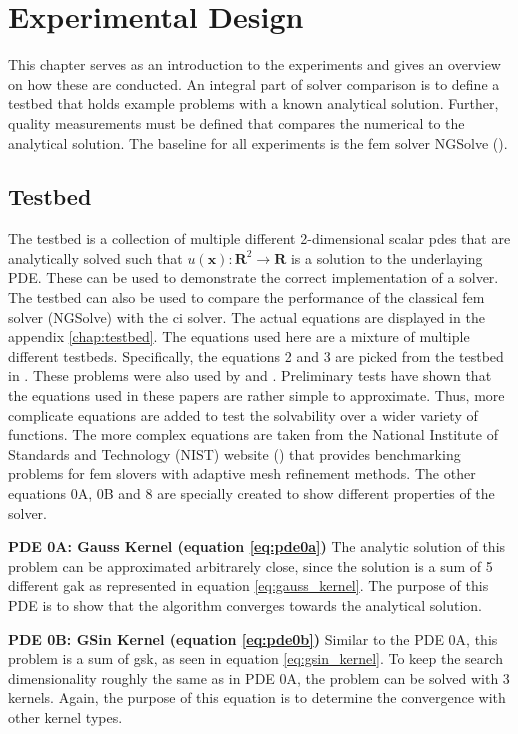 \documentclass[./\jobname.tex]{subfiles}
\begin{document}
\chapter{Experimental Design}
This chapter serves as an introduction to the experiments and gives an overview on how these are conducted. An integral part of solver comparison is to define a testbed that holds example problems with a known analytical solution. Further, quality measurements must be defined that compares the numerical to the analytical solution. The baseline for all experiments is the \gls{fem} solver NGSolve (\cite{mitchell_nist_2018}).

\section{Testbed}
The testbed is a collection of multiple different 2-dimensional scalar \gls{pde}s that are analytically solved such that $u(\mathbf{x}): \mathbf{R}^2 \rightarrow \mathbf{R}$ is a solution to the underlaying PDE. These can be used to demonstrate the correct implementation of a solver. The testbed can also be used to compare the performance of the classical \gls{fem} solver (NGSolve) with the \gls{ci} solver. The actual equations are displayed in the appendix \ref{chap:testbed}. The equations used here are a mixture of multiple different testbeds. Specifically, the equations 2 and 3 are picked from the testbed in \cite{chaquet_using_2019}. These problems were also used by \cite{tsoulos_solving_2006} and \cite{panagant_solving_2014}. Preliminary tests have shown that the equations used in these papers are rather simple to approximate. Thus, more complicate equations are added to test the solvability over a wider variety of functions. The more complex equations are taken from the National Institute of Standards and Technology (NIST) website (\cite{mitchell_nist_2018}) that provides benchmarking problems for \gls{fem} slovers with adaptive mesh refinement methods. The other equations 0A, 0B and 8 are specially created to show different properties of the solver. 

\textbf{PDE 0A: Gauss Kernel (equation \ref{eq:pde0a})} The analytic solution of this problem can be approximated arbitrarely close, since the solution is a sum of 5 different \gls{gak} as represented in equation \ref{eq:gauss_kernel}. The purpose of this PDE is to show that the algorithm converges towards the analytical solution. 

\textbf{PDE 0B: GSin Kernel (equation \ref{eq:pde0b})} Similar to the PDE 0A, this problem is a sum of \gls{gsk}, as seen in equation \ref{eq:gsin_kernel}. To keep the search dimensionality roughly the same as in PDE 0A, the problem can be solved with 3 kernels. Again, the purpose of this equation is to determine the convergence with other kernel types. 
\end{document}
